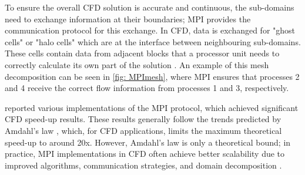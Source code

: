 To ensure the overall CFD solution is accurate and continuous, the sub-domains need to exchange information at their boundaries; MPI provides the communication protocol for this exchange. In CFD, data is exchanged for "ghost cells" or "halo cells" which are at the interface between neighbouring sub-domains. These cells contain data from adjacent blocks that a processor unit needs to correctly calculate its own part of the solution \cite{Afzal2017, Giovannini2015}. An example of this mesh decomposition can be seen in \autoref{fig: MPImesh}, where MPI ensures that processes 2 and 4 receive the correct flow information from processes 1 and 3, respectively. 


\textcite{Afzal2017} reported various implementations of the MPI protocol, which achieved significant CFD speed-up results. These results generally follow the trends predicted by Amdahl’s law \cite{Amdahl1967}, which, for CFD applications, limits the maximum theoretical speed-up to around 20x. However, Amdahl’s law is only a theoretical bound; in practice, MPI implementations in CFD often achieve better scalability due to improved algorithms, communication strategies, and domain decomposition \cite{Giovannini2015, Hadade2016}.





